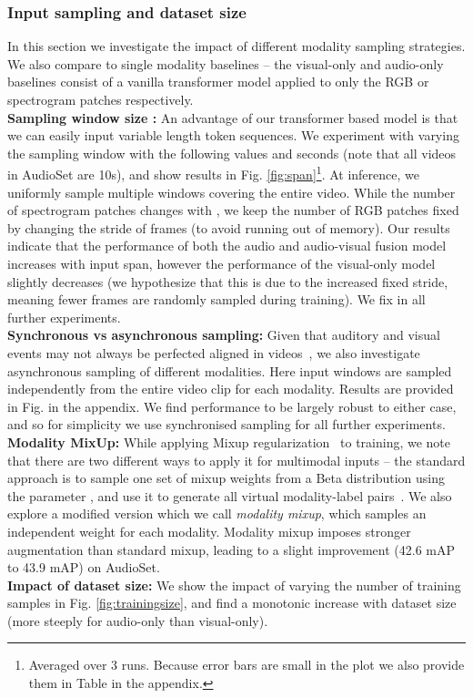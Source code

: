 \subsubsection{Input sampling and dataset size} 
In this section we investigate the impact of different modality sampling strategies. We also compare to single modality baselines -- the visual-only and audio-only baselines consist of a vanilla transformer model applied to only the RGB or spectrogram patches respectively. \\
\noindent\textbf{Sampling window size :} An advantage of our transformer based model is that we can easily input variable length token sequences. We experiment with varying the sampling window  with the following values  and  seconds (note that all videos in AudioSet are 10s), and show results in Fig. \ref{fig:span}\footnote{Averaged over 3 runs. Because error bars are small in the plot we also provide them in Table \if{} \else{\ref{tab:span-ablation}}
\fi in the appendix.}. At inference, we uniformly sample multiple windows covering the entire video. While the number of spectrogram patches  changes with , we keep the number of RGB patches  fixed by changing the stride of frames (to avoid running out of memory). Our results indicate that the performance of both the audio and audio-visual fusion model increases with input span, however the performance of the visual-only model slightly decreases (we hypothesize that this is due to the increased fixed stride, meaning fewer frames are randomly sampled during training). We fix  in all further experiments.  \\
\noindent\textbf{Synchronous vs asynchronous sampling:} Given that auditory and visual events may not always be perfected aligned in videos~\cite{kazakos2019epic}, we also investigate asynchronous sampling of different modalities. Here input windows are sampled independently from the entire video clip for each modality. Results are provided in Fig. \if{} \else{\ref{fig:sync-async}}
\fi in the appendix. We find performance to be largely robust to either case, and so for simplicity we use synchronised sampling for all further experiments.  \\
\noindent\textbf{Modality MixUp:} While applying Mixup regularization~\cite{zhang2017mixup} to training, we note that there are two different ways to apply it for multimodal inputs -- the standard approach is to sample one set of mixup weights from a Beta distribution using the parameter , and use it to generate all virtual modality-label pairs~\cite{zhang2017mixup}. We also explore a modified version which we call \textit{modality mixup}, which samples an independent weight for each modality. Modality mixup imposes stronger augmentation than standard mixup, leading to a slight improvement (42.6 mAP to 43.9 mAP) on AudioSet.\\
\noindent\textbf{Impact of dataset size:} We show the impact of varying the number of training samples in Fig. \ref{fig:trainingsize}, and find a monotonic increase with dataset size (more steeply for audio-only than visual-only).



